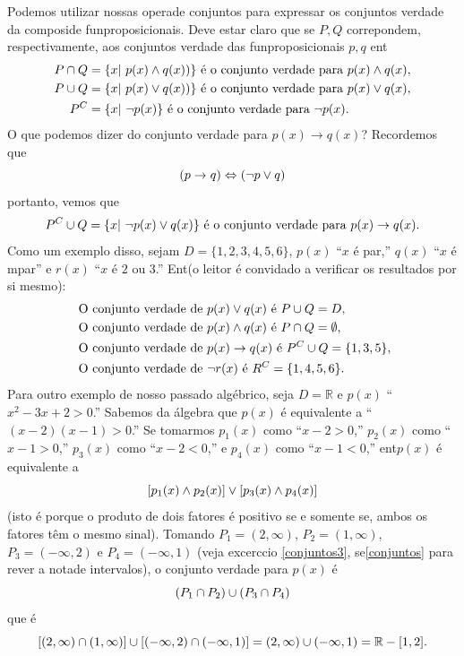 Podemos utilizar nossas opera\coes de conjuntos para expressar os conjuntos verdade da composi\cao de fun\coes proposicionais. Deve estar claro que se $P,Q$ correpondem, respectivamente, aos conjuntos verdade das fun\coes proposicionais $p,q$ ent\ao
\begin{equation*}
 \begin{aligned}
P\cap Q&=\{x|\textrm{ } p(x)\wedge q(x))\} \textrm{ \'e o conjunto verdade para } p(x)\wedge q(x),\\
P\cup Q&=\{x|\textrm{ } p(x)\vee q(x))\} \textrm{ \'e o conjunto verdade para } p(x)\vee q(x),\\
P^C&=\{x|\textrm{ } \lnot p(x)\} \textrm{ \'e o conjunto verdade para } \lnot p(x).
 \end{aligned}
\end{equation*}
O que podemos dizer do conjunto verdade para $p(x)\to q(x)$? Recordemos que
\[
(p\to q)\Leftrightarrow (\lnot p\vee q)
\]
portanto, vemos que
\[
P^C\cup Q=\{x|\textrm{ } \lnot p(x)\vee q(x)\} \textrm{ \'e o conjunto verdade para } p(x)\to q(x).
\]
Como um exemplo disso, sejam $D=\{1,2,3,4,5,6\}$, $p(x)$ ``$x$ \'e par,'' $q(x)$ ``$x$ \'e \ih mpar'' e $r(x)$ ``$x$ \'e $2$ ou $3$.'' Ent\ao (o leitor \'e convidado a verificar os resultados por si mesmo):
\begin{equation*}
 \begin{aligned}
&\textrm{ O conjunto verdade de $p(x)\vee q(x)$ \'e } P\cup Q=D,\\
&\textrm{ O conjunto verdade de $p(x)\wedge q(x)$ \'e } P\cap Q=\emptyset,\\
&\textrm{ O conjunto verdade de $p(x)\to q(x)$ \'e } P^C\cup Q = \{1,3,5\},\\
&\textrm{ O conjunto verdade de $\lnot r(x)$ \'e } R^C=\{1,4,5,6\}.\\
 \end{aligned}
\end{equation*}
Para outro exemplo de nosso passado alg\'ebrico, seja $D=\mathbb{R}$ e $p(x)$ ``$x^2-3x+2>0$.'' Sabemos da \'algebra que $p(x)$ \'e equivalente a ``$(x-2)(x-1)>0$.'' Se tomarmos $p_1(x)$ como ``$x-2>0$,'' $p_2(x)$ como ``$x-1>0$,'' $p_3(x)$ como ``$x-2<0$,'' e $p_4(x)$ como ``$x-1<0$,'' ent\ao $p(x)$ \'e equivalente a 
\[
[p_1(x)\wedge p_2(x)]\vee[p_3(x)\wedge p_4(x)]
\]
(isto \'e porque o produto de dois fatores \'e positivo se e somente se, ambos os fatores t\^em o mesmo sinal). Tomando $P_1=(2,\infty)$, $P_2=(1,\infty)$, $P_3=(-\infty,2)$ e $P_4=(-\infty,1)$ (veja excerc\ih cio \ref{conjuntos3}, se\cao \ref{conjuntos} para rever a nota\cao de intervalos), o conjunto verdade para $p(x)$ \'e
\[
(P_1\cap P_2)\cup(P_3\cap P_4)
\] 
que \'e
\[
[(2,\infty)\cap (1,\infty)]\cup[(-\infty,2)\cap (-\infty,1)]=(2,\infty)\cup(-\infty,1)=\mathbb{R}-[1,2].
\]

